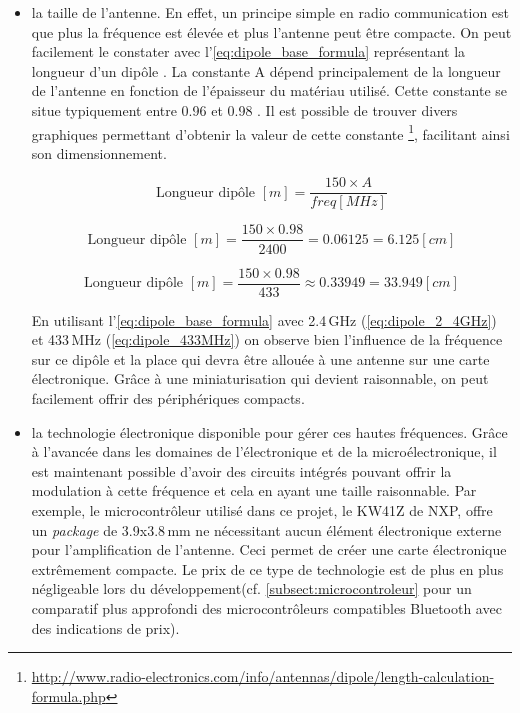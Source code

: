 \begin{itemize}
    \item la taille de l'antenne. En effet, un principe simple en radio communication est que plus la fréquence est élevée et plus l'antenne peut être compacte. On peut facilement le constater avec l'\autoref{eq:dipole_base_formula} représentant la longueur d'un dipôle \cite{DipoleLe18:online}. La constante A dépend principalement de la longueur de l'antenne en fonction de l'épaisseur du matériau utilisé. Cette constante se situe typiquement entre 0.96 et 0.98 \cite{DipoleLe18:online}. Il est possible de trouver divers graphiques permettant d'obtenir la valeur de cette constante \footnote{\url{http://www.radio-electronics.com/info/antennas/dipole/length-calculation-formula.php}}, facilitant ainsi son dimensionnement.
    
    
    \begin{equation}
    \label{eq:dipole_base_formula}
    \text{Longueur dipôle }[m] = \frac{150 \times A}{freq [MHz]}
    \end{equation}

    \begin{equation}
    \label{eq:dipole_2_4GHz}
    \text{Longueur dipôle }[m] = \frac{150 \times 0.98}{2400} = 0.06125 = 6.125 [cm]
    \end{equation}
    
    \begin{equation}
    \label{eq:dipole_433MHz}
    \text{Longueur dipôle }[m] = \frac{150 \times 0.98}{433} \approx 0.33949 = 33.949 [cm]
    \end{equation}
    
    En utilisant l'\autoref{eq:dipole_base_formula} avec 2.4\,GHz (\autoref{eq:dipole_2_4GHz}) et 433\,MHz (\autoref{eq:dipole_433MHz}) on observe bien l'influence de la fréquence sur ce dipôle et la place qui devra être allouée à une antenne sur une carte électronique. Grâce à une miniaturisation qui devient raisonnable, on peut facilement offrir des périphériques compacts.\\
    
    \item la technologie électronique disponible pour gérer ces hautes fréquences. Grâce à l'avancée dans les domaines de l'électronique et de la microélectronique, il est maintenant possible d'avoir des circuits intégrés pouvant offrir la modulation à cette fréquence et cela en ayant une taille raisonnable. Par exemple, le microcontrôleur utilisé dans ce projet, le KW41Z de NXP, offre un \textit{package} de 3.9x3.8\,mm ne nécessitant aucun élément électronique externe pour l'amplification de l'antenne. Ceci permet de créer une carte électronique extrêmement compacte. Le prix de ce type de technologie est de plus en plus négligeable lors du développement(cf. \autoref{subsect:microcontroleur} pour un comparatif plus approfondi des microcontrôleurs compatibles Bluetooth avec des indications de prix).\\
    

\end{itemize}
